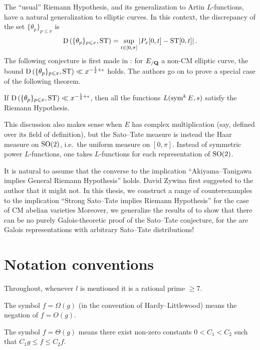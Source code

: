 The ``usual'' Riemann Hypothesis, and its generalization to Artin 
$L$-functions, have a natural generalization to elliptic curves. In this 
context, the discrepancy of the set $\{\theta_p\}_{p\leqslant x}$ is 
\[
	\operatorname{D}\left(\{\theta_p\}_{p\leqslant x},\mathrm{ST}\right) = \sup_{t\in [0,\pi]} \left| P_x[0,t] - \mathrm{ST}[0,t]\right| .
\]
The following conjecture is first made in \cite{akiyama-tanigawa-1999}: for 
$E_{/\mathbf{Q}}$ a non-CM elliptic curve, the bound 
$\operatorname{D}\left(\{\theta_p\}_{p\leqslant x},\mathrm{ST}\right)\ll x^{-\frac 1 2+\epsilon}$ 
holds. The authors go on to prove a special case of the following theorem.

\begin{theorem}
If $\operatorname{D}\left(\{\theta_p\}_{p\leqslant x},\mathrm{ST}\right)\ll x^{-\frac 1 2+\epsilon}$, 
then all the functions $L(\operatorname{sym}^k E, s)$ satisfy the Riemann Hypothesis. 
\end{theorem}

This discussion also makes sense when $E$ has complex multiplication (say, 
defined over its field of definition), but the Sato--Tate measure is instead 
the Haar measure on $\operatorname{SO}(2)$, i.e.~the uniform measure on $[0,\pi]$. Instead of 
symmetric power $L$-functions, one takes $L$-functions for each representation 
of $\operatorname{SO}(2)$. 

It is natural to assume that the converse to the implication 
``Akiyama--Tanigawa implies General Riemann Hypothesis'' holds. David Zywina 
first suggested to the author that it might not. In this thesis, we construct a 
range of counterexamples to the implication ``Strong Sato--Tate implies 
Riemann Hypothesis'' for the case of CM abelian varieties Moreover, we 
generalize the results of \cite{pande-2011} to show that there can be no 
purely Galois-theoretic proof of the Sato--Tate conjecture, for the are 
Galois representations with arbitrary Sato--Tate distributions! 





\section{Notation conventions}

Throughout, whenever $l$ is mentioned it is a rational prime $\geqslant 7$. 

The symbol $f=\Omega(g)$ (in the convention of Hardy--Littlewood) means 
the negation of $f = O(g)$.

The symbol $f = \Theta(g)$ means there exist non-zero constants $0<C_1<C_2$
such that $C_1 g \leqslant f \leqslant C_2 f$. 


